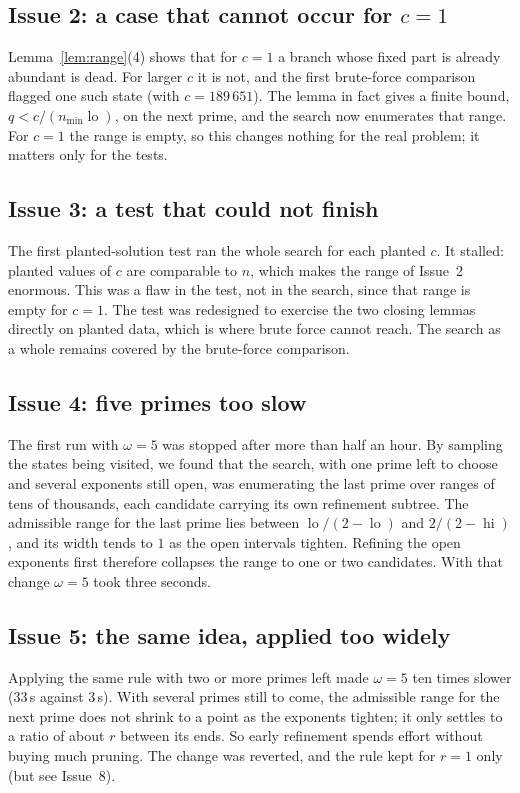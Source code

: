 \documentclass[11pt]{amsart}
\theoremstyle{remark}
\DeclareMathOperator{\lo}{lo}
\DeclareMathOperator{\hi}{hi}
\begin{document}
\subsection{Issue 2: a case that cannot occur for $c = 1$}
Lemma~\ref{lem:range}(4) shows that for $c = 1$ a branch whose fixed part is
already abundant is dead. For larger $c$ it is not, and the first brute-force
comparison flagged one such state (with $c = 189\,651$). The lemma in fact gives
a finite bound, $q < c/(n_{\min}\lo)$, on the next prime, and the search now
enumerates that range. For $c = 1$ the range is empty, so this changes nothing
for the real problem; it matters only for the tests.

\subsection{Issue 3: a test that could not finish}
The first planted-solution test ran the whole search for each planted $c$. It
stalled: planted values of $c$ are comparable to $n$, which makes the range of
Issue~2 enormous. This was a flaw in the test, not in the search, since that
range is empty for $c = 1$. The test was redesigned to exercise the two closing
lemmas directly on planted data, which is where brute force cannot reach. The
search as a whole remains covered by the brute-force comparison.

\subsection{Issue 4: five primes too slow}
The first run with $\omega = 5$ was stopped after more than half an hour. By
sampling the states being visited, we found that the search, with one prime left
to choose and several exponents still open, was enumerating the last prime over
ranges of tens of thousands, each candidate carrying its own refinement subtree.
The admissible range for the last prime lies between
$\lo/(2-\lo)$ and $2/(2-\hi)$, and its width tends to $1$ as the open intervals
tighten. Refining the open exponents first therefore collapses the range to one
or two candidates. With that change $\omega = 5$ took three seconds.

\subsection{Issue 5: the same idea, applied too widely}
Applying the same rule with two or more primes left made $\omega = 5$ ten times
slower (33\,s against 3\,s). With several primes still to come, the admissible
range for the next prime does not shrink to a point as the exponents tighten; it
only settles to a ratio of about $r$ between its ends. So early refinement
spends effort without buying much pruning. The change was reverted, and the
rule kept for $r = 1$ only (but see Issue~8).
\end{document}
